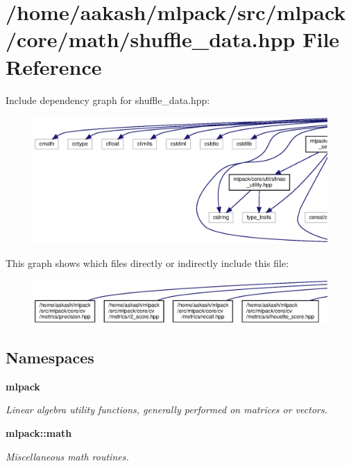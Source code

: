 \section{/home/aakash/mlpack/src/mlpack/core/math/shuffle\+\_\+data.hpp File Reference}
\label{shuffle__data_8hpp}
Include dependency graph for shuffle\+\_\+data.\+hpp\+:
\nopagebreak
\begin{figure}[H]
\begin{center}
\leavevmode
\includegraphics[width=350pt]{shuffle__data_8hpp__incl}
\end{center}
\end{figure}
This graph shows which files directly or indirectly include this file\+:
\nopagebreak
\begin{figure}[H]
\begin{center}
\leavevmode
\includegraphics[width=350pt]{shuffle__data_8hpp__dep__incl}
\end{center}
\end{figure}
\subsection*{Namespaces}
\begin{DoxyCompactItemize}
\item 
 \textbf{ mlpack}
\begin{DoxyCompactList}\small\item\em Linear algebra utility functions, generally performed on matrices or vectors. \end{DoxyCompactList}\item 
 \textbf{ mlpack\+::math}
\begin{DoxyCompactList}\small\item\em Miscellaneous math routines. \end{DoxyCompactList}\end{DoxyCompactItemize}
